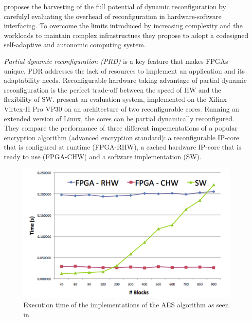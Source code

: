 \cite{reconfigurable} proposes the harvesting of the full potential of dynamic reconfiguration by carefulyl evaluating the overhead of reconfiguration in hardware-software interfacing. To overcome the limits introduced by increasing complexity and the workloads to maintain complex infrastructues they propose to adopt a codesigned self-adaptive and autonomic computing system. 

\emph{Partial dynamic reconfiguration (PRD)} is a key feature that makes FPGAs unique. PDR addresses the lack of resources to implement an application and its adaptability needs. Reconfigurable hardware taking advantage of partial dynamic reconfiguration is the perfect trade-off between the speed of HW and the flexibility of SW. \cite{reconfigurable} present an evaluation system, implemented on the Xilinx Virtex-II Pro VP30 on an architecture of two reconfigurable cores. Running an extended version of Linux, the cores can be partial dynamically reconfigured. They compare the performance of three different impementations of a popular encryption algorithm (advanced encryption standard): a reconfigurable IP-core that is configured at runtime (FPGA-RHW), a cached hardware IP-core that is ready to use (FPGA-CHW) and a software implementation (SW). 
\begin{figure}[htb]%
\includegraphics[width=\columnwidth]{Pictures/reconfig.png}%
\caption{Execution time of the implementations of the AES algorithm as seen in \cite{reconfigurable}}%
\label{fig:reconfig}%
\end{figure} 
